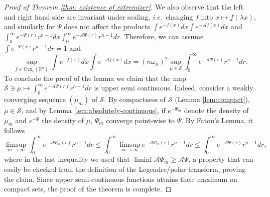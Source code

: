 \documentclass[11pt]{article}
\newcommand{\1}{[1]}
\begin{document}
\begin{proof} [Proof of Theorem \ref{thm: existence of extremizer}]
We also observe that the left and right hand side are invariant under scaling, \textit{i.e.}\ changing $f$ into $x \mapsto f(\lambda x)$, and similarly for $\Psi$ does not affect the products $\int e^{-f(x)}dx\int e^{-\mathcal{A}f(x)}dx$ and $\int_0^\infty e^{-\Psi(r)}r^{n-1}dx\int_0^\infty e^{-\mathcal{A}\Psi(r)}r^{n-1}dr$. Therefore, we can assume $\int e^{-\Psi(r)}r^{n-1}dr=1$ and 
$$
\sup_{f \in \mathrm{Cvx}_0(\mathbb{R}^{n})} \int e^{-f(x)}dx\int e^{-\mathcal{A}f(x)}dx
= (n\omega_n)^2 \sup_{\mu \in \mathcal{S}} \int_0^\infty e^{-\mathcal{A}\Psi(r)}r^{n-1}dr .
$$
To conclude the proof of the lemma we claim that the map $\mathcal{S} \ni \mu \mapsto \int_0^\infty e^{-\mathcal{A}\Psi(r)}r^{n-1}dr$  is upper semi continuous. Indeed, consider a weakly converging sequence $(\mu_m)$ of $\mathcal{S}$. By compactness of $\mathcal{S}$ (Lemma \ref{lem:compact}), $\mu \in \mathcal{S}$, and by Lemma \ref{lem:absolutely-continuous},  if $e^{-\Psi_m}$ denote the density of $\mu_m$ and $e^{-\Psi}$ the density of $\mu$, $\Psi_m$ converge point-wise to $\Psi$.
By Fatou's Lemma, it follows
$$
\limsup_{m\rightarrow\infty}\int_{0}^{\infty}e^{-\mathcal{A}\Psi_{m}(r)}r^{n-1}dr\leq\int_{0}^{\infty}\limsup_{m\rightarrow\infty}e^{-\mathcal{A}\Psi_{m}(r)}r^{n-1}dr
\leq 
\int_{0}^{\infty}e^{-\mathcal{A}\Psi(r)}r^{n-1}dr,
$$ 
where in the last inequality we used that $\liminf \mathcal{A}\Psi_m \geq \mathcal{A}\Psi$, a property that can easily be checked from the definition of the Legendre/polar transform, proving the claim. 
Since upper semi-continuous functions attains their maximum on compact sets, the proof of the theorem is complete.


\end{proof}
\end{document}
